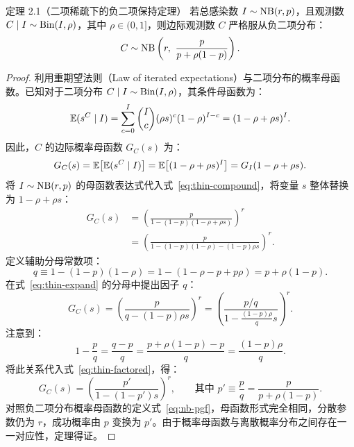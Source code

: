 \begin{theorembox}{定理 2.1（二项稀疏下的负二项保持定理）}
若总感染数 $I \sim \mathrm{NB}(r, p)$，且观测数 $C \mid I \sim \mathrm{Bin}(I, \rho)$，其中 $\rho \in (0, 1]$，则边际观测数 $C$ 严格服从负二项分布：
\begin{equation}
  C \sim \NB\left(r,\ \frac{p}{p + \rho(1-p)}\right).
\end{equation}
\end{theorembox}

\begin{proof}
利用重期望法则（Law of iterated expectations）与二项分布的概率母函数。已知对于二项分布 $C \mid I \sim \mathrm{Bin}(I, \rho)$，其条件母函数为：
\begin{equation}
  \mathbb{E}(s^C \mid I) = \sum_{c=0}^I \binom{I}{c} (\rho s)^c (1-\rho)^{I-c} = (1 - \rho + \rho s)^I.
\end{equation}
因此，$C$ 的边际概率母函数 $G_C(s)$ 为：
\begin{equation}
  G_C(s) = \mathbb{E}\big[\mathbb{E}(s^C \mid I)\big] = \mathbb{E}\big[(1 - \rho + \rho s)^I\big] = G_I(1 - \rho + \rho s).
  \label{eq:thin-compound}
\end{equation}
将 $I \sim \mathrm{NB}(r, p)$ 的母函数表达式代入式~\eqref{eq:thin-compound}，将变量 $s$ 整体替换为 $1 - \rho + \rho s$：
\begin{align}
  G_C(s) &= \left( \frac{p}{1 - (1-p)(1 - \rho + \rho s)} \right)^r \nonumber \\
  &= \left( \frac{p}{1 - (1-p)(1-\rho) - (1-p)\rho s} \right)^r.
  \label{eq:thin-expand}
\end{align}
定义辅助分母常数项：
\begin{equation}
  q \equiv 1 - (1-p)(1-\rho) = 1 - (1 - \rho - p + p\rho) = p + \rho(1-p).
\end{equation}
在式~\eqref{eq:thin-expand} 的分母中提出因子 $q$：
\begin{equation}
  G_C(s) = \left( \frac{p}{q - (1-p)\rho s} \right)^r = \left( \frac{p/q}{1 - \frac{(1-p)\rho}{q} s} \right)^r.
  \label{eq:thin-factored}
\end{equation}
注意到：
\begin{equation}
  1 - \frac{p}{q} = \frac{q - p}{q} = \frac{p + \rho(1-p) - p}{q} = \frac{(1-p)\rho}{q}.
\end{equation}
将此关系代入式~\eqref{eq:thin-factored}，得：
\begin{equation}
  G_C(s) = \left( \frac{p'}{1 - (1 - p')s} \right)^r, \qquad \text{其中 } p' \equiv \frac{p}{q} = \frac{p}{p + \rho(1-p)}.
\end{equation}
对照负二项分布概率母函数的定义式~\eqref{eq:nb-pgf}，母函数形式完全相同，分散参数仍为 $r$，成功概率由 $p$ 变换为 $p'$。由于概率母函数与离散概率分布之间存在一一对应性，定理得证。
\end{proof}

